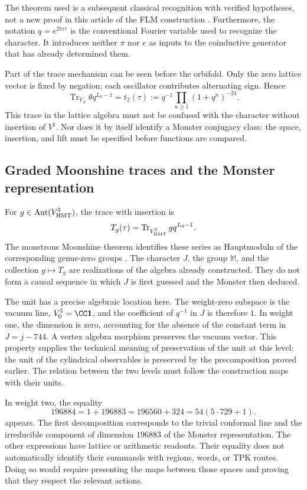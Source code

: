 The theorem used is a subsequent classical recognition with
verified hypotheses, not a new proof in this article of the
FLM construction \cite{flm}.
Furthermore, the notation $q=e^{2\pi i\tau}$ is the conventional Fourier
variable used to recognize the character. It introduces neither $\pi$
nor $e$ as inputs to the coinductive generator that has already determined them.

Part of the trace mechanism can be seen before the orbifold.
Only the zero lattice vector is fixed by negation; each
oscillator contributes alternating sign. Hence
\[
 \operatorname{Tr}_{V_\Lambda}\theta q^{L_0-1}
   =t_2(\tau)
   :=q^{-1}\prod_{n\geq1}(1+q^n)^{-24}.
\]
This trace in the lattice algebra must not be confused with the
character without insertion of $V^\natural$. Nor does it by itself identify
a Monster conjugacy class: the space, insertion,
and lift must be specified before functions are compared.



\subsection{Graded Moonshine traces and the Monster representation}
\label{exc:alcance}

For $g\in\operatorname{Aut}(V^\natural_{\rm HMT})$, the trace
with insertion is
\[
 T_g(\tau)=
 \operatorname{Tr}_{V^\natural_{\rm HMT}}gq^{L_0-1}.
\]
The monstrous Moonshine theorem identifies these series as
Hauptmoduln of the corresponding genus-zero groups
\cite[Theorem~1.1]{borcherds}.
The character $J$, the group $\mathbb M$, and the collection $g\mapsto T_g$
are realizations of the algebra already constructed. They do not form a causal
sequence in which $J$ is first guessed and the Monster then deduced.

The unit has a precise algebraic location here. The weight-zero
subspace is the vacuum line, \(V^\natural_0=\CC\mathbf1\), and
the coefficient of \(q^{-1}\) in \(J\) is therefore \(1\). In weight one,
the dimension is zero, accounting for the absence of the constant term
in \(J=j-744\). A vertex algebra morphism preserves the vacuum
vector. This property supplies the technical meaning of preservation
of the unit at this level; the unit of the cylindrical observables
is preserved by the precomposition proved earlier. The relation
between the two levels must follow the construction maps with their units.

In weight two, the equality
\[
 196884=1+196883=196560+324=54(5\cdot729+1).
\]
appears.
The first decomposition corresponds to the trivial conformal line and the
irreducible component of dimension $196883$ of the Monster
representation. The other expressions have lattice or arithmetic
readouts. Their equality does not automatically identify their summands
with regions, words, or TPK routes. Doing so would require
presenting the maps between those spaces and proving that they respect the
relevant actions.


